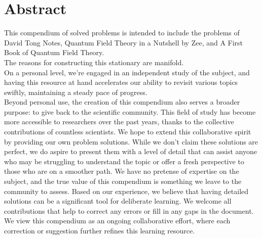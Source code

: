 \chapter{Abstract}
This compendium of solved problems is intended to include the problems of David Tong Notes, Quantum Field Theory in a Nutshell by Zee, and A First Book of Quantum Field Theory. \\
The reasons for constructing this stationary are manifold. \\
On a personal level, we're engaged in an independent study of the subject, and having this resource at hand accelerates our ability to revisit various topics swiftly, maintaining a steady pace of progress. \\

Beyond personal use, the creation of this compendium also serves a broader purpose: to give back to the scientific community. This field of study has become more accessible to researchers over the past years, thanks to the collective contributions of countless scientists. We hope to extend this collaborative spirit by providing our own problem solutions. While we don't claim these solutions are perfect, we do aspire to present them with a level of detail that can assist anyone who may be struggling to understand the topic or offer a fresh perspective to those who are on a smoother path. We have no pretense of expertise on the subject, and the true value of this compendium is something we leave to the community to assess. Based on our experience, we believe that having detailed solutions can be a significant tool for deliberate learning. We welcome all contributions that help to correct any errors or fill in any gaps in the document. We view this compendium as an ongoing collaborative effort, where each correction or suggestion further refines this learning resource.\\

